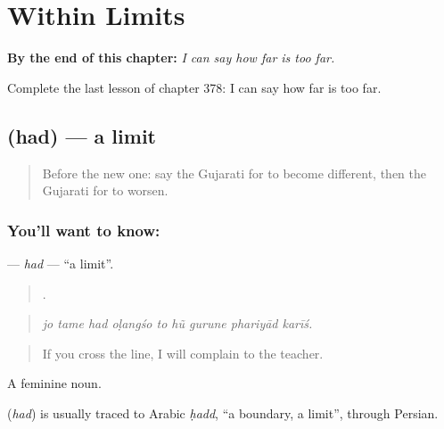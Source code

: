 
\chapter{Within Limits}
\label{ch:gu-within-limits}

\begin{chapteropening}
\textbf{By the end of this chapter:} \emph{I can say how far is too far.}

Complete the last lesson of chapter 378: I can say how far is too far.
\end{chapteropening}

\section[\texorpdfstring{\gu{હદ} (had)}{હદ (had)}]{ (had) — a limit}

\label{lesson:GU-C378-had}



\begin{quote}
Before the new one: say the Gujarati for to become different, then the Gujarati for to worsen.
\end{quote}

\subsection*{You'll want to know: }
\textbf{} — \emph{had} — \textquotedblleft{}a limit\textquotedblright{}.

\begin{quote}
        .
\end{quote}

\begin{quote}
\emph{jo tame had oḷangśo to hũ gurune phariyād karīś.}
\end{quote}

\begin{quote}
If you cross the line, I will complain to the teacher.
\end{quote}

A feminine noun.

\begin{cousinweb}
\textbf{} (\emph{had}) is usually traced to Arabic \emph{ḥadd}, \textquotedblleft{}a boundary, a limit\textquotedblright{}, through Persian.
\end{cousinweb}

